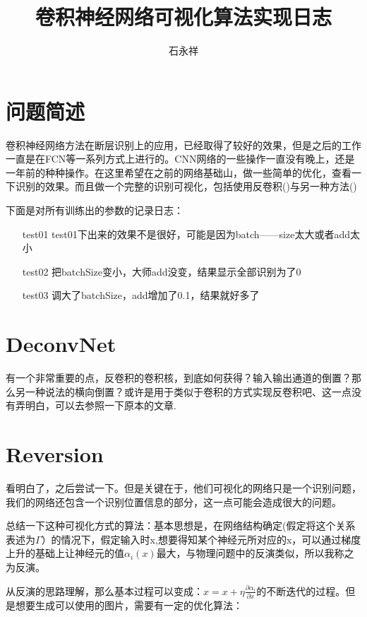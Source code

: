 \documentclass[UTF8]{article}
\author{石永祥}
\affil{Peking University, Geophysics\\ Email: shiyxg@163.com}
\date{}
\title{卷积神经网络可视化算法实现日志}
\begin{document}
  
\maketitle
\section{问题简述}
卷积神经网络方法在断层识别上的应用，已经取得了较好的效果，但是之后的工作一直是在FCN等一系列方式上进行的。CNN网络的一些操作一直没有晚上，还是一年前的种种操作。在这里希望在之前的网络基础山，做一些简单的优化，查看一下识别的效果。而且做一个完整的识别可视化，包括使用反卷积(\cite{deconvnet})与另一种方法(\cite{reversion})\par
下面是对所有训练出的参数的记录日志：
\begin{itemize}
	\item[test01]test01下出来的效果不是很好，可能是因为batch——size太大或者add太小
	\item[test02]把batchSize变小，大师add没变，结果显示全部识别为了0
	\item[test03]调大了batchSize，add增加了0.1，结果就好多了
\end{itemize}

\section{DeconvNet}
有一个非常重要的点，反卷积的卷积核，到底如何获得？输入输出通道的倒置？那么另一种说法的横向倒置？或许是用于类似于卷积的方式实现反卷积吧、这一点没有弄明白，可以去参照一下原本的文章.


\section{Reversion}
看明白了，之后尝试一下。但是关键在于，他们可视化的网络只是一个识别问题，我们的网络还包含一个识别位置信息的部分，这一点可能会造成很大的问题。\par

总结一下这种可视化方式的算法：基本思想是，在网络结构确定(假定将这个关系表述为$\Gamma$）的情况下，假定输入时x,想要得知某个神经元所对应的x，可以通过梯度上升的基础上让神经元的值$\alpha_i(x)$最大，与物理问题中的反演类似，所以我称之为反演。\par
从反演的思路理解，那么基本过程可以变成：$x =x+\eta\frac{\partial\alpha_i}{\partial x}$的不断迭代的过程。但是想要生成可以使用的图片，需要有一定的优化算法：\par
\end{document}
